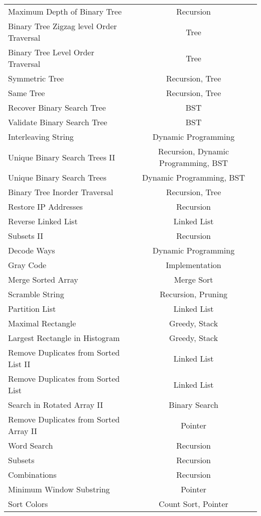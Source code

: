 \documentclass[paper=a4, fontsize=11pt]{scrartcl} %
\begin{document}
\begin{center}
\begin{longtable}{|l|c|}
    Maximum Depth of Binary Tree    &   Recursion   \\
    Binary Tree Zigzag level Order Traversal    &   Tree  \\
    Binary Tree Level Order Traversal   &   Tree  \\
    Symmetric Tree  &   Recursion, Tree   \\
    Same Tree   &   Recursion, Tree   \\
    Recover Binary Search Tree  &   BST \\
    Validate Binary Search Tree &   BST \\
    Interleaving String &   Dynamic Programming \\
    Unique Binary Search Trees II   &   Recursion, Dynamic Programming, BST \\
    Unique Binary Search Trees  &   Dynamic Programming, BST \\   
    Binary Tree Inorder Traversal   &   Recursion, Tree  \\
    Restore IP Addresses    &   Recursion  \\
    Reverse Linked List &   Linked List \\
    Subsets II  &   Recursion  \\
    Decode Ways &   Dynamic Programming \\
    Gray Code   &   Implementation  \\
    Merge Sorted Array  &   Merge Sort  \\
    Scramble String &   Recursion, Pruning \\
    Partition List  &   Linked List \\
    Maximal Rectangle   &   Greedy, Stack   \\
    Largest Rectangle in Histogram  &   Greedy, Stack  \\
    Remove Duplicates from Sorted List II &   Linked List \\
    Remove Duplicates from Sorted List  &   Linked List \\
    Search in Rotated Array II  &   Binary Search   \\
    Remove Duplicates from Sorted Array II  &  Pointer  \\
    Word Search &   Recursion  \\
    Subsets &   Recursion  \\
    Combinations    &   Recursion  \\
    Minimum Window Substring    &   Pointer \\
    Sort Colors &   Count Sort, Pointer  \\

\end{longtable}
\end{center}
\end{document}
